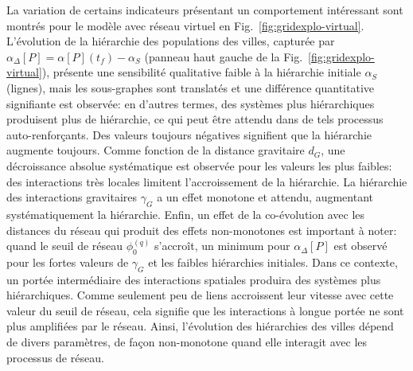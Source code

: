\documentclass[english,fleqn,allpages]{ISTE_science}[2018/07/30]
\begin{document}
{La variation de certains indicateurs présentant un comportement intéressant sont montrés pour le modèle avec réseau virtuel en Fig.~\ref{fig:gridexplo-virtual}. L'évolution de la hiérarchie des populations des villes, capturée par $\alpha_{\Delta}\left[P\right] = \alpha \left[P\right](t_f) - \alpha_S$ (panneau haut gauche de la Fig.~\ref{fig:gridexplo-virtual}), présente une sensibilité qualitative faible à la hiérarchie initiale $\alpha_S$ (lignes), mais les sous-graphes sont translatés et une différence quantitative signifiante est observée: en d'autres termes, des systèmes plus hiérarchiques produisent plus de hiérarchie, ce qui peut être attendu dans de tels processus auto-renforçants. Des valeurs toujours négatives signifient que la hiérarchie augmente toujours. Comme fonction de la distance gravitaire $d_G$, une décroissance absolue systématique est observée pour les valeurs les plus faibles: des interactions très locales limitent l'accroissement de la hiérarchie. La hiérarchie des interactions gravitaires $\gamma_G$ a un effet monotone et attendu, augmentant systématiquement la hiérarchie. Enfin, un effet de la co-évolution avec les distances du réseau qui produit des effets non-monotones est important à noter: quand le seuil de réseau $\phi_0^{(q)}$ s'accroît, un minimum pour $\alpha_{\Delta}\left[P\right]$  est observé pour les fortes valeurs de $\gamma_G$ et les faibles hiérarchies initiales. Dans ce contexte, un portée intermédiaire des interactions spatiales produira des systèmes plus hiérarchiques. Comme seulement peu de liens accroissent leur vitesse avec cette valeur du seuil de réseau, cela signifie que les interactions à longue portée ne sont plus amplifiées par le réseau. Ainsi, l'évolution des hiérarchies des villes dépend de divers paramètres, de façon non-monotone quand elle interagit avec les processus de réseau.
}
\end{document}
